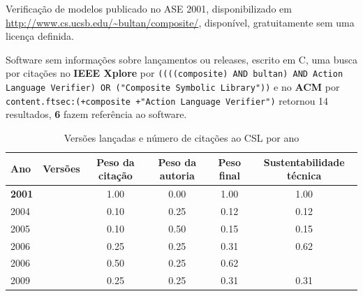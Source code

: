 Verificação de modelos
publicado no ASE 2001,
disponibilizado em \url{http://www.cs.ucsb.edu/~bultan/composite/},
disponível,
gratuitamente
sem uma licença definida.

Software sem informações sobre lançamentos ou releases,
escrito em C,
uma busca por citações no {\bf IEEE Xplore} por
\texttt{((((composite) AND bultan) AND Action Language Verifier) OR ("Composite Symbolic Library"))}
e no {\bf ACM} por
\texttt{content.ftsec:(+composite +"Action Language Verifier")}
retornou
14 resultados,
{\bf 6} fazem referência ao software.


\begin{table}[H]
\caption{Versões lançadas e número de citações ao CSL por ano}
\centering
\begin{tabular}{| l | c | c | c | c | c |}
  \hline
  Ano & Versões & Peso da citação & Peso da autoria & Peso final & Sustentabilidade técnica \\
  \hline
            {\bf 2001}
          &
          
          &
          1.00
          &
          0.00
          &
          1.00
          &
            {\color{blue} 1.00}
          \\
\hline
            2004
          &
          
          &
          0.10
          &
          0.25
          &
          0.12
          &
            {\color{red} 0.12}
          \\
\hline
            2005
          &
          
          &
          0.10
          &
          0.50
          &
          0.15
          &
            {\color{red} 0.15}
          \\
\hline
            2006
          &
          
          &
          0.25
          &
          0.25
          &
          0.31
          &
            {\color{blue} 0.62}
          \\
            2006
          &
          
          &
          0.50
          &
          0.25
          &
          0.62
          &
          \\
\hline
            2009
          &
          
          &
          0.25
          &
          0.25
          &
          0.31
          &
            {\color{red} 0.31}
          \\
\hline
\end{tabular}
\end{table}

